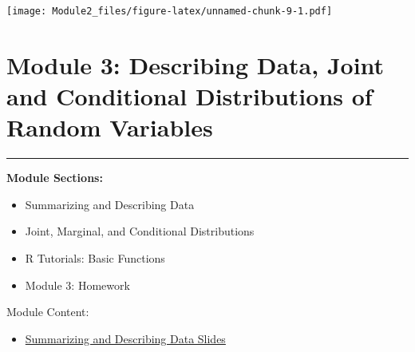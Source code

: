 \documentclass[]{book}
\newenvironment{Shaded}{\begin{snugshade}}{\end{snugshade}}
\newcommand{\KeywordTok}[1]{\textcolor[rgb]{0.13,0.29,0.53}{\textbf{#1}}}
\newcommand{\DataTypeTok}[1]{\textcolor[rgb]{0.13,0.29,0.53}{#1}}
\newcommand{\StringTok}[1]{\textcolor[rgb]{0.31,0.60,0.02}{#1}}
\newcommand{\OperatorTok}[1]{\textcolor[rgb]{0.81,0.36,0.00}{\textbf{#1}}}
\newcommand{\NormalTok}[1]{#1}
\providecommand{\tightlist}{%
  \setlength{\itemsep}{0pt}\setlength{\parskip}{0pt}}
\theoremstyle{definition}
\theoremstyle{definition}
\theoremstyle{definition}
\theoremstyle{remark}
\begin{document}
\begin{Shaded}
\end{Shaded}

\texttt{[image: Module2\_files/figure-latex/unnamed-chunk-9-1.pdf]}

\chapter{Module 3: Describing Data, Joint and Conditional Distributions
of Random
Variables}\label{module-3-describing-data-joint-and-conditional-distributions-of-random-variables}

\begin{center}\rule{0.5\linewidth}{\linethickness}\end{center}

\textbf{Module Sections:}

\begin{itemize}
\tightlist
\item
  Summarizing and Describing Data
\item
  Joint, Marginal, and Conditional Distributions
\item
  R Tutorials: Basic Functions
\item
  Module 3: Homework
\end{itemize}

Module Content:

\begin{itemize}
\tightlist
\item
  \href{./files/M3/SummarizingandDescribingDataSlides.pdf}{Summarizing
  and Describing Data Slides}
\end{itemize}
\end{document}
